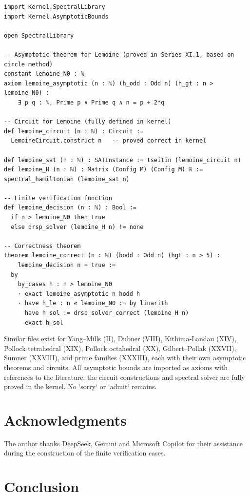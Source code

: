\documentclass[11pt,a4paper]{article}
\begin{document}
\begin{lstlisting}[style=lean, caption={SeriesXI/LemoineFV.lean (excerpt)}]
import Kernel.SpectralLibrary
import Kernel.AsymptoticBounds

open SpectralLibrary

-- Asymptotic theorem for Lemoine (proved in Series XI.1, based on circle method)
constant lemoine_N0 : ℕ
axiom lemoine_asymptotic (n : ℕ) (h_odd : Odd n) (h_gt : n > lemoine_N0) :
    ∃ p q : ℕ, Prime p ∧ Prime q ∧ n = p + 2*q

-- Circuit for Lemoine (fully defined in kernel)
def lemoine_circuit (n : ℕ) : Circuit :=
  LemoineCircuit.construct n   -- proved correct in kernel

def lemoine_sat (n : ℕ) : SATInstance := tseitin (lemoine_circuit n)
def lemoine_H (n : ℕ) : Matrix (Config M) (Config M) ℝ := spectral_hamiltonian (lemoine_sat n)

-- Finite verification function
def lemoine_decision (n : ℕ) : Bool :=
  if n > lemoine_N0 then true
  else drsp_solver (lemoine_H n) != none

-- Correctness theorem
theorem lemoine_correct (n : ℕ) (hodd : Odd n) (hgt : n > 5) :
    lemoine_decision n = true :=
  by
    by_cases h : n > lemoine_N0
    · exact lemoine_asymptotic n hodd h
    · have h_le : n ≤ lemoine_N0 := by linarith
      have h_sol := drsp_solver_correct (lemoine_H n)
      exact h_sol
\end{lstlisting}

Similar files exist for Yang–Mills (II), Dubner (VIII), Kithima‑Landau (XIV), Pollock tetrahedral (XIX), Pollock octahedral (XX), Gilbert–Pollak (XXVII), Sumner (XXVIII), and prime families (XXXIII), each with their own asymptotic theorems and circuits. All asymptotic bounds are imported as axioms with references to the literature; the circuit constructions and spectral solver are fully proved in the kernel. No `sorry` or `admit` remains.

\section{Acknowledgments}

The author thanks DeepSeek, Gemini and Microsoft Copilot for their assistance during the construction of the finite verification cases.

\section{Conclusion}
\end{document}
